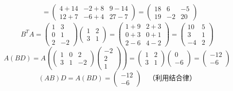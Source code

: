 \begin{exer}
$$\begin{aligned}
&= \begin{pmatrix} 4+14 & -2+8 & 9-14 \\ 12+7 & -6+4 & 27-7 \end{pmatrix} = \begin{pmatrix} 18 & 6 & -5 \\ 19 & -2 & 20 \end{pmatrix}
\end{aligned}
$$
$$
B^T A = \begin{pmatrix} 1 & 3 \\ 0 & 1 \\ 2 & -2 \end{pmatrix} \begin{pmatrix} 1 & 2 \\ 3 & 1 \end{pmatrix} = \begin{pmatrix} 1+9 & 2+3 \\ 0+3 & 0+1 \\ 2-6 & 4-2 \end{pmatrix} = \begin{pmatrix} 10 & 5 \\ 3 & 1 \\ -4 & 2 \end{pmatrix}
$$
$$
A(BD) = A \left( \begin{pmatrix} 1 & 0 & 2 \\ 3 & 1 & -2 \end{pmatrix} \begin{pmatrix} -2 \\ 2 \\ 1 \end{pmatrix} \right) = \begin{pmatrix} 1 & 2 \\ 3 & 1 \end{pmatrix} \begin{pmatrix} 0 \\ -6 \end{pmatrix} = \begin{pmatrix} -12 \\ -6 \end{pmatrix}
$$
$$ (AB)D = A(BD) = \begin{pmatrix} -12 \\ -6 \end{pmatrix} \quad \text{（利用结合律）} $$


\end{exer}
